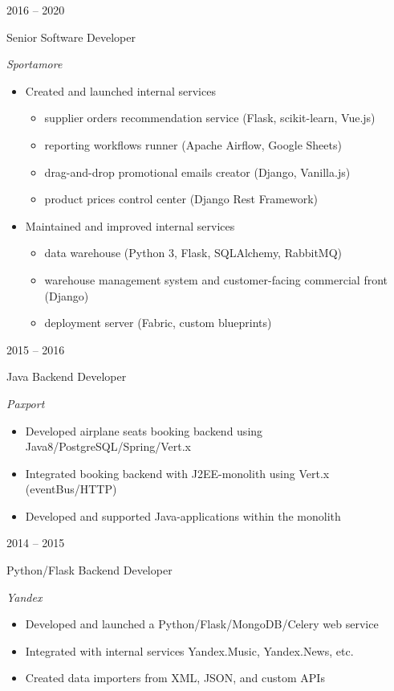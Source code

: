 \documentclass[a4paper,10pt]{article}
\newlength{\cvcolumngapwidth}
\newlength{\cvleftcolumnwidth}
\newlength{\cvrightcolumnwidth}
\newcommand{\employer}[1]{{\itshape #1}}
\newcommand{\cvtitlestyle}[1]{{\large\cvtitlefont\textcolor{cvtitlecolor}{#1}}}
\newcommand{\cvdurationstyle}[1]{{\small\cvdurationfont\textcolor{cvdurationcolor}{#1}}}
\newlength{\cvafteritemskipamount}
\newlength{\cvaftertitleskipamount}
\newlength{\cvparskip}
\newcommand{\cvitem}[2]{
    \begin{minipage}[t]{\cvleftcolumnwidth}
        \raggedleft #1
    \end{minipage}%
    \hspace{\cvcolumngapwidth}%
    \begin{minipage}[t]{\cvrightcolumnwidth}
        \setlength{\parskip}{\cvparskip} #2
    \end{minipage}

    \vspace{\cvafteritemskipamount}
}
\newcommand{\cvtitle}[1]{
    \cvtitlestyle{#1}

    \vspace{\cvaftertitleskipamount}
    \vspace{-\cvparskip}
}
\begin{document}
\cvitem{
    \cvdurationstyle{2016 -- 2020}
}{
    \cvtitle{Senior Software Developer}

    \employer{Sportamore}

    \begin{itemize}[leftmargin=*]
        \item Created and launched internal services
	    \begin{itemize}[leftmargin=*]
		  \item supplier orders recommendation service (Flask, scikit-learn, Vue.js)
		  \item reporting workflows runner (Apache Airflow, Google Sheets)
		  \item drag-and-drop promotional emails creator (Django, Vanilla.js)
		  \item product prices control center (Django Rest Framework)
	    \end{itemize}
    \end{itemize}

    \begin{itemize}[leftmargin=*]
        \item Maintained and improved internal services 
	    \begin{itemize}[leftmargin=*]
		  \item data warehouse (Python 3, Flask, SQLAlchemy, RabbitMQ)
                  \item warehouse management system and customer-facing commercial front (Django)
		  \item deployment server (Fabric, custom blueprints)
	    \end{itemize}
    \end{itemize}
}

\cvitem{
    \cvdurationstyle{2015 -- 2016}
}{
    \cvtitle{Java Backend Developer}

    \employer{Paxport}

    \begin{itemize}[leftmargin=*]
	\item Developed airplane seats booking backend using Java8/PostgreSQL/Spring/Vert.x
	\item Integrated booking backend with J2EE-monolith using Vert.x (eventBus/HTTP)
	\item Developed and supported Java-applications within the monolith
    \end{itemize}
}

\cvitem{
    \cvdurationstyle{2014 -- 2015}
}{
    \cvtitle{Python/Flask Backend Developer}

    \employer{Yandex}

    \begin{itemize}[leftmargin=*]
	\item Developed and launched a Python/Flask/MongoDB/Celery web service
	\item Integrated with internal services Yandex.Music, Yandex.News, etc.
	\item Created data importers from XML, JSON, and custom APIs
    \end{itemize}
}
\end{document}
